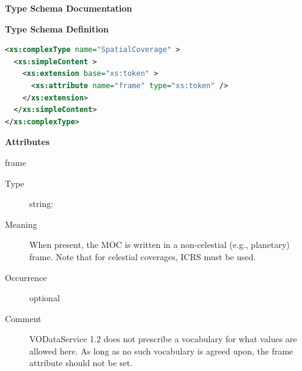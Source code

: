 \documentclass[11pt,a4paper]{ivoa}
\begin{document}
\begin{generated}
\begingroup
        \renewcommand*\descriptionlabel[1]{%
        \hbox to 5.5em{\emph{#1}\hfil}}\vspace{2ex}\noindent\textbf{ Type Schema Documentation}


\vspace{1ex}\noindent\textbf{ Type Schema Definition}

\begin{lstlisting}[language=XML,basicstyle=\footnotesize]
<xs:complexType name="SpatialCoverage" >
  <xs:simpleContent >
    <xs:extension base="xs:token" >
      <xs:attribute name="frame" type="xs:token" />
    </xs:extension>
  </xs:simpleContent>
</xs:complexType>
\end{lstlisting}

\vspace{0.5ex}\noindent\textbf{ Attributes}

\begingroup\small\begin{bigdescription}
\item[frame]
\begin{description}
\item[Type] string: 
\item[Meaning]
                     When present, the MOC is written in a non-celestial (e.g.,
                     planetary) frame.  Note that for celestial coverages,
                     ICRS must be used.

\item[Occurrence] optional
\item[Comment]
                     VODataService 1.2 does not prescribe a vocabulary for
                     what values are allowed here.  As
                     long as no such vocabulary is agreed upon, the frame
                     attribute should not be set.

\end{description}


\end{bigdescription}\endgroup

\endgroup
\end{generated}
\end{document}
